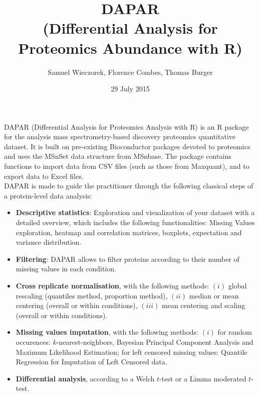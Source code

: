 \documentclass[12pt,a4paper]{article}
\begin{document}

\title{DAPAR\\(Differential Analysis for Proteomics Abundance with R)}
\author{Samuel Wieczorek, Florence Combes, Thomas Burger}
\date{29 July 2015}
\maketitle


DAPAR (Differential Analysis for Proteomics Analysis with R) is an R package 
for the analysis mass spectrometry-based discovery proteomics quantitative dataset. 
It is built on pre-existing Bioconductor packages devoted to proteomics and uses the MSnSet data structure from MSnbase. The package contains functions to import data from CSV files (such as those from Maxquant), and to export data to Excel files.\\

DAPAR is made to guide the practitioner through the following classical steps of a protein-level data analysis: 
  \begin{itemize}
    \item \textbf{Descriptive statistics}: Exploration and visualization of your dataset with a detailed overview, which includes the following functionalities:
    Missing Values exploration, 
    heatmap and correlation matrices, 
    boxplots, expectation and variance distribution. 
    
    \item \textbf{Filtering}: 
    DAPAR allows to filter proteins according to their number of missing values in each condition. 
    
    \item \textbf{Cross replicate normalisation}, with the following methods: 
    $(i)$ global rescaling (quantiles method, proportion method),
    $(ii)$ median or mean centering (overall or within conditions),
    $(iii)$ mean centering and scaling (overall or within conditions).
    
    \item \textbf{Missing values imputation}, with the following methods: $(i)$ for random occurences: $k$-nearest-neighbors, Bayesian Principal Component Analysis and Maximum Likelihood Estimation; for left censored missing values: Quantile Regression for Imputation of Left Censored data.
    
    \item \textbf{Differential analysis}, according to a Welch $t$-test or a Limma moderated $t$-test.
   \end{itemize}
\end{document}
